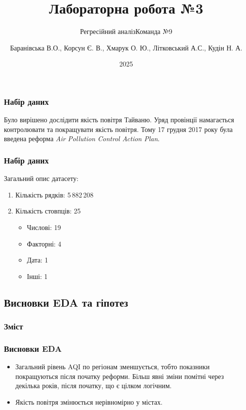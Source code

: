 ﻿\documentclass{beamer}
\title{Лабораторна робота №3}
\subtitle{Регресійний аналіз}
\subtitle{Команда №9}
\author[]{
  Баранівська В.О.,
  Корсун Є. В.,
  Хмарук О. Ю.,
  Літковський А.С.,
  Кудін Н. А.
}
\date{2025}
\begin{document}
\frame{\titlepage}

\graphicspath{{../../../}} %


\begin{frame}
  \frametitle{Набір даних}

  Було вирішено дослідити якість повітря Тайваню. Уряд провінції намагається
  контролювати та покращувати якість повітря. Тому 17 грудня 2017 року була введена
  реформа \textit{Air Pollution Control Action Plan}.

  \begin{center}

  \end{center}
\end{frame}

\begin{frame}
  \frametitle{Набір даних}

  Загальний опис датасету:

  \begin{enumerate}
    \item Кількість рядків: 5\,882\,208
    \item Кількість стовпців: 25

    \begin{itemize}
      \item Числові: 19
      \item Факторні: 4
      \item Дата: 1
      \item Інші: 1
    \end{itemize}
  \end{enumerate}
\end{frame}

\begin{frame}
  \section{Висновки EDA та гіпотез}

  \frametitle{Зміст}
  \tableofcontents[currentsection]
\end{frame}

\begin{frame}
  \frametitle{Висновки EDA}
   \begin{itemize}

  \item Загальний рівень AQI по регіонам зменшується, тобто показники покращуються після початку реформи.
  Більш явні зміни помітні через декілька років, після початку, що є цілком логічним.
  \item Якість повітря змінюється нерівномірно у містах.

  \end{itemize}
\end{frame}
\end{document}
